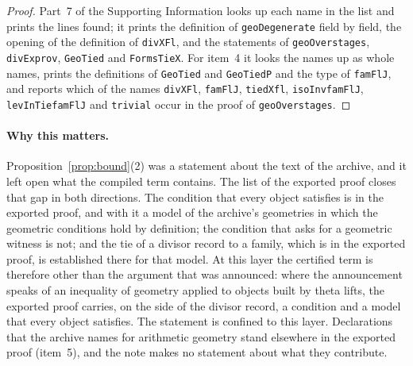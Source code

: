 \documentclass[11pt]{article}
\theoremstyle{definition}
\theoremstyle{remark}
\DeclareRobustCommand{\lean}[1]{{\renewcommand{\_}{\textunderscore\allowbreak}\texttt{#1}}}
\begin{document}
\begin{proof}
Part~7 of the Supporting Information looks up each name in the list and prints the lines found; it prints the definition of \lean{geoDegenerate} field by field, the opening of the definition of \lean{divXFl}, and the statements of \lean{geoOver\_stages}, \lean{divEx\_prov}, \lean{GeoTied} and \lean{FormsTieX}. For item~4 it looks the names up as whole names, prints the definitions of \lean{GeoTied} and \lean{GeoTiedP} and the type of \lean{famFlJ}, and reports which of the names \lean{divXFl}, \lean{famFlJ}, \lean{tiedX\_fl}, \lean{isoInv\_famFlJ}, \lean{levInTie\_famFlJ} and \lean{trivial} occur in the proof of \lean{geoOver\_stages}.
\end{proof}

\paragraph{Why this matters.} Proposition~\ref{prop:bound}(2) was a statement about the text of the archive, and it left open what the compiled term contains. The list of the exported proof closes that gap in both directions. The condition that every object satisfies is in the exported proof, and with it a model of the archive's geometries in which the geometric conditions hold by definition; the condition that asks for a geometric witness is not; and the tie of a divisor record to a family, which is in the exported proof, is established there for that model. At this layer the certified term is therefore other than the argument that was announced: where the announcement speaks of an inequality of geometry applied to objects built by theta lifts, the exported proof carries, on the side of the divisor record, a condition and a model that every object satisfies. The statement is confined to this layer. Declarations that the archive names for arithmetic geometry stand elsewhere in the exported proof (item~5), and the note makes no statement about what they contribute.
\end{document}
